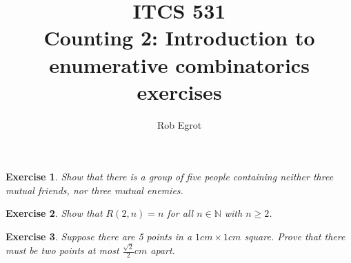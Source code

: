 \documentclass{article}
\title{ITCS 531 \\Counting 2: Introduction to enumerative combinatorics exercises}
\author{Rob Egrot}
\date{}
\theoremstyle{plain}
\newtheorem{Q}{Exercise}{\bfseries}{\upshape}
\newcommand{\bN}{\mathbb{N}}
\begin{document}
\maketitle

\begin{Q}\label{\prefix Q:Ram}
Show that there is a group of five people containing neither three mutual friends, nor three mutual enemies.
\end{Q}
\begin{comment}
\textbf{Solution:}
Look at the graph in the picture, where edges represent friendship, and consider the vertex $x$. Then $x$ cannot be part of a group of three mutual friends, because $x$ only has two friends, and they are not friends with each other. Also, $x$ can't be part of a group of three mutual enemies, because $x$ only has two enemies, and they are friends with each other. From the shape of the graph, this reasoning obviously applies to every vertex, so the graph has the required property.
\[\xymatrix{ & \bullet_x\ar@{-}[dr]\ar@{-}[dl] \\
\bullet\ar@{-}[d] & & \bullet\ar@{-}[d] \\
\bullet\ar@{-}[rr] & & \bullet
}\] 
\end{comment}

\begin{Q}
Show that $R(2,n)= n$ for all $n\in\bN$ with $n\geq 2$. 
\end{Q}
\begin{comment}
\textbf{Solution:}
Given a group of $n$ people, if none of the people are friends, then the whole group is mutual enemies. This proves $R(2,n)\leq n$. Also, given a group of $n-1$ people, if none of them are friends than there are only $n-1$ mutual enemies. This proves $R(2,n) \geq n$, and so $R(2,n)= n$ as claimed. 
\end{comment}

\begin{Q}
Suppose there are 5 points in a $1cm\times 1cm$ square. Prove that there must be two points at most $\frac{\sqrt 2}{2}cm$ apart.
\end{Q}
\begin{comment}
\textbf{Solution:}
Divide the square into four quarters. Since there are five points, at least two must be in the same quarter. If two points are in the same quarter then they are both inside a square whose edges are 0.5cm long. The furthest apart they can be is the length of the diagonal of this square, which is $\sqrt{(\frac{1}{2})^2+ (\frac{1}{2})^2}cm$, which is $\frac{\sqrt 2}{2}cm$.
\end{comment}
\end{document}
